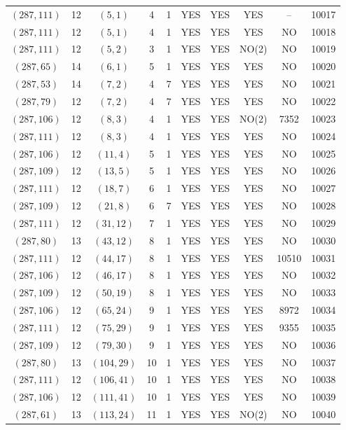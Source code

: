 \begin{longtable}{|c|c|c|c|c|c|c|c|c|c|}
$(287, 111)$ & 12 & $(5, 1)$ & 4 & 1 & YES & YES & YES & -- & 10017\\
$(287, 111)$ & 12 & $(5, 1)$ & 4 & 1 & YES & YES & YES & NO & 10018\\
$(287, 111)$ & 12 & $(5, 2)$ & 3 & 1 & YES & YES & NO(2) & NO & 10019\\
$(287, 65)$ & 14 & $(6, 1)$ & 5 & 1 & YES & YES & YES & NO & 10020\\
$(287, 53)$ & 14 & $(7, 2)$ & 4 & 7 & YES & YES & YES & NO & 10021\\
$(287, 79)$ & 12 & $(7, 2)$ & 4 & 7 & YES & YES & YES & NO & 10022\\
$(287, 106)$ & 12 & $(8, 3)$ & 4 & 1 & YES & YES & NO(2) & 7352 & 10023\\
$(287, 111)$ & 12 & $(8, 3)$ & 4 & 1 & YES & YES & YES & NO & 10024\\
$(287, 106)$ & 12 & $(11, 4)$ & 5 & 1 & YES & YES & YES & NO & 10025\\
$(287, 109)$ & 12 & $(13, 5)$ & 5 & 1 & YES & YES & YES & NO & 10026\\
$(287, 111)$ & 12 & $(18, 7)$ & 6 & 1 & YES & YES & YES & NO & 10027\\
$(287, 109)$ & 12 & $(21, 8)$ & 6 & 7 & YES & YES & YES & NO & 10028\\
$(287, 111)$ & 12 & $(31, 12)$ & 7 & 1 & YES & YES & YES & NO & 10029\\
$(287, 80)$ & 13 & $(43, 12)$ & 8 & 1 & YES & YES & YES & NO & 10030\\
$(287, 111)$ & 12 & $(44, 17)$ & 8 & 1 & YES & YES & YES & 10510 & 10031\\
$(287, 106)$ & 12 & $(46, 17)$ & 8 & 1 & YES & YES & YES & NO & 10032\\
$(287, 109)$ & 12 & $(50, 19)$ & 8 & 1 & YES & YES & YES & NO & 10033\\
$(287, 106)$ & 12 & $(65, 24)$ & 9 & 1 & YES & YES & YES & 8972 & 10034\\
$(287, 111)$ & 12 & $(75, 29)$ & 9 & 1 & YES & YES & YES & 9355 & 10035\\
$(287, 109)$ & 12 & $(79, 30)$ & 9 & 1 & YES & YES & YES & NO & 10036\\
$(287, 80)$ & 13 & $(104, 29)$ & 10 & 1 & YES & YES & YES & NO & 10037\\
$(287, 111)$ & 12 & $(106, 41)$ & 10 & 1 & YES & YES & YES & NO & 10038\\
$(287, 106)$ & 12 & $(111, 41)$ & 10 & 1 & YES & YES & YES & NO & 10039\\
$(287, 61)$ & 13 & $(113, 24)$ & 11 & 1 & YES & YES & NO(2) & NO & 10040\\

\end{longtable}
